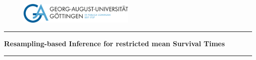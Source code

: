 
\thispagestyle{empty}

\vspace*{\fill}
\begin{center}

\begin{figure}[htbp]
  \centering
  \includegraphics[width=0.5\textwidth]{assets/uni-goe-logo.png}
\end{figure}

\rule{\linewidth}{0.5mm}

{\Large \textbf{Resampling-based Inference for restricted mean Survival Times}}

\rule{\linewidth}{0.5mm} \\

\end{center}

\vspace*{\fill}



\newpage
{}

{
\setcounter{tocdepth}{3}
\tableofcontents
}
\newpage


\listoffigures

\listoftables
